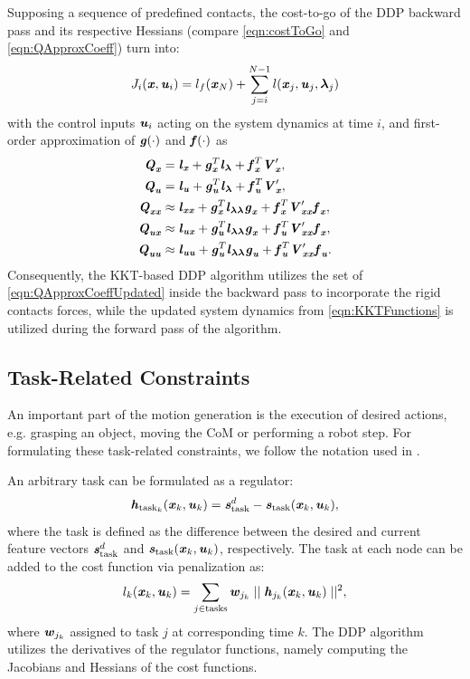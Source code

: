 Supposing a sequence of predefined contacts, the cost-to-go of the \gls{DDP} backward pass and its respective Hessians (compare \cref{eqn:costToGo} and \ref{eqn:QApproxCoeff}) turn into:
\begin{equation*}\label{eqn:CostToGoUpdated}
J_i(\bm{\mathit{x}}, \bm{\mathit{u}}_i)=l_f(\bm{\mathit{x}}_N)+\sum_{j=i}^{N-1}l(\bm{\mathit{x}}_j,\bm{\mathit{u}}_j,\bm{\mathit{\lambda}}_j)
\end{equation*}
with the control inputs $\bm{\mathit{u}}_i$ acting on the system dynamics at time $i$, and first-order approximation of $\bm{\mathit{g}}(\cdot)$ and $\bm{\mathit{f}}(\cdot)$ as
\begin{align}\label{eqn:QApproxCoeffUpdated}
\begin{split}
\bm{\mathit{Q}}_{\bm{\mathit{x}}} &= \bm{\mathit{l}}_{\bm{\mathit{x}}}+\bm{\mathit{g}}_{\bm{\mathit{x}}}^T\bm{\mathit{l}}_{\bm{\mathit{\lambda}}}+\bm{\mathit{f}}_{\bm{\mathit{x}}}^T \bm{\mathit{V}}_{\bm{\mathit{x}}}^\prime, \\
\bm{\mathit{Q}}_{\bm{\mathit{u}}} &= \bm{\mathit{l}}_{\bm{\mathit{u}}}+\bm{\mathit{g}}_{\bm{\mathit{u}}}^T\bm{\mathit{l}}_{\bm{\mathit{\lambda}}}+\bm{\mathit{f}}_{\bm{\mathit{u}}}^T \bm{\mathit{V}}_{\bm{\mathit{x}}}^\prime, \\
\bm{\mathit{Q}}_{\bm{\mathit{x}}\bm{\mathit{x}}} &\approx \bm{\mathit{l}}_{\bm{\mathit{x}}\bm{\mathit{x}}}+\bm{\mathit{g}}_{\bm{\mathit{x}}}^T\bm{\mathit{l}}_{\bm{\mathit{\lambda\lambda}}}\bm{\mathit{g}}_{\bm{\mathit{x}}}+\bm{\mathit{f}}_{\bm{\mathit{x}}}^T \bm{\mathit{V}}_{\bm{\mathit{x}}\bm{\mathit{x}}}^\prime\bm{\mathit{f}}_{\bm{\mathit{x}}},\\
\bm{\mathit{Q}}_{\bm{\mathit{u}}\bm{\mathit{x}}} &\approx \bm{\mathit{l}}_{\bm{\mathit{u}}\bm{\mathit{x}}}+\bm{\mathit{g}}_{\bm{\mathit{u}}}^T\bm{\mathit{l}}_{\bm{\mathit{\lambda\lambda}}}\bm{\mathit{g}}_{\bm{\mathit{x}}}+\bm{\mathit{f}}_{\bm{\mathit{u}}}^T \bm{\mathit{V}}_{\bm{\mathit{x}}\bm{\mathit{x}}}^\prime\bm{\mathit{f}}_{\bm{\mathit{x}}},\\
\bm{\mathit{Q}}_{\bm{\mathit{u}}\bm{\mathit{u}}} &\approx \bm{\mathit{l}}_{\bm{\mathit{u}}\bm{\mathit{u}}}+\bm{\mathit{g}}_{\bm{\mathit{u}}}^T\bm{\mathit{l}}_{\bm{\mathit{\lambda\lambda}}}\bm{\mathit{g}}_{\bm{\mathit{u}}}+\bm{\mathit{f}}_{\bm{\mathit{u}}}^T \bm{\mathit{V}}_{\bm{\mathit{x}}\bm{\mathit{x}}}^\prime\bm{\mathit{f}}_{\bm{\mathit{u}}}.
\end{split}
\end{align}
Consequently, the \gls{KKT}-based \gls{DDP} algorithm utilizes the set of \cref{eqn:QApproxCoeffUpdated} inside the backward pass to incorporate the rigid contacts forces, while the updated system dynamics from \cref{eqn:KKTFunctions} is utilized during the forward pass of the algorithm. 

\subsection{Task-Related Constraints}
An important part of the motion generation is the execution of desired actions, e.g. grasping an object, moving the \gls{CoM} or performing a robot step. For formulating these task-related constraints, we follow the notation used in \cite{giraud2020motion}.

An arbitrary task can be formulated as a regulator: 
\begin{equation*} 
\bm{\mathit{h}}_{\text{task}_k}(\bm{\mathit{x}}_k,\bm{\mathit{u}}_k)=\bm{\mathit{s}}_{\text{task}}^d-\bm{\mathit{s}}_{\text{task}}(\bm{\mathit{x}}_k,\bm{\mathit{u}}_k),
\end{equation*}   
where the task is defined as the difference between the desired and current feature vectors $\bm{\mathit{s}}_{\text{task}}^d$ and $\bm{\mathit{s}}_{\text{task}}(\bm{\mathit{x}}_k,\bm{\mathit{u}}_k)$, respectively. The task at each node can be added to the cost function via penalization as: 
\begin{equation*} 
l_k(\bm{\mathit{x}}_k,\bm{\mathit{u}}_k)=\sum_{j\in \text{tasks}}\bm{\mathit{w}}_{j_k}\mid\mid\bm{\mathit{h}}_{j_k}(\bm{\mathit{x}}_k,\bm{\mathit{u}}_k)\mid\mid^2,
\end{equation*}  
where $\bm{\mathit{w}}_{j_k}$ assigned to task $j$ at corresponding time $k$. The \gls{DDP} algorithm utilizes the derivatives of the regulator functions, namely computing the Jacobians and Hessians of the cost functions. 

